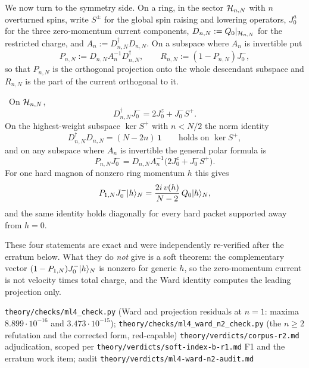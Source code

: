 We now turn to the symmetry side. On a ring, in the sector $\mathcal{H}_{n,N}$ with
$n$ overturned spins, write $S^\pm$ for the global spin raising and lowering
operators, $J^a_0$ for the three zero-momentum current components,
$D_{n,N}:=Q_0|_{\mathcal{H}_{n,N}}$ for the restricted charge, and
$A_n:=D_{n,N}^{\dagger}D_{n,N}$. On a subspace where $A_n$ is invertible put
\begin{equation}
  P_{n,N}:=D_{n,N}A_n^{-1}D_{n,N}^{\dagger},
  \qquad
  R_{n,N}:=(1-P_{n,N})J^-_0 ,
  \label{eq:descendant-projector}
\end{equation}
so that $P_{n,N}$ is the orthogonal projection onto the whole descendant
subspace and $R_{n,N}$ is the part of the current orthogonal to it.

\begin{theorem}
\label{thm:ml4-ward}
\statusProved\ On $\mathcal{H}_{n,N}$,
\begin{equation}
  D_{n,N}^{\dagger}J^-_0=2J^z_0+J^-_0S^+ .
  \label{eq:ward-8}
\end{equation}
On the highest-weight subspace $\ker S^+$ with $n<N/2$ the norm identity
\begin{equation}
  D_{n,N}^{\dagger}D_{n,N}=(N-2n)\,\mathbf 1
  \qquad\text{holds on }\ker S^+ ,
  \label{eq:ward-norm}
\end{equation}
and on any subspace where $A_n$ is invertible the general polar formula is
\begin{equation}
  P_{n,N}J^-_0=D_{n,N}A_n^{-1}\bigl(2J^z_0+J^-_0S^+\bigr).
  \label{eq:ward-polar}
\end{equation}
For one hard magnon of nonzero ring momentum $h$ this gives
\begin{equation}
  P_{1,N}J^-_0|h\rangle_N=\frac{2i\,v(h)}{N-2}\,Q_0|h\rangle_N ,
  \label{eq:ward-onehard}
\end{equation}
and the same identity holds diagonally for every hard packet supported away
from $h=0$.
\end{theorem}
\begin{scope}
These four statements are exact and were independently re-verified after the
erratum below. What they do \emph{not} give is a soft theorem: the
complementary vector $(1-P_{1,N})J^-_0|h\rangle_N$ is nonzero for generic $h$,
so the zero-momentum current is not velocity times total charge, and the Ward
identity computes the leading projection only.
\end{scope}
%
{\texttt{theory/checks/ml4\_check.py} (Ward and projection residuals at $n=1$:
maxima $8.899\cdot10^{-16}$ and $3.473\cdot10^{-15}$);
\texttt{theory/checks/ml4\_ward\_n2\_check.py} (the $n\ge2$ refutation and the
corrected form, red-capable)}%
{\texttt{theory/verdicts/corpus-r2.md} adjudication, scoped per
\texttt{theory/verdicts/soft-index-b-r1.md} F1 and the erratum work item;
audit \texttt{theory/verdicts/ml4-ward-n2-audit.md}}

